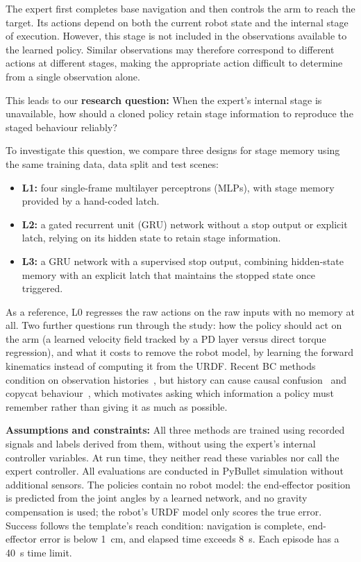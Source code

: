 \documentclass[conference]{IEEEtran}
\begin{document}
The expert first completes base navigation and then controls the arm
to reach the target. Its actions depend on both the current robot
state and the internal stage of execution. However, this stage is
not included in the observations available to the learned policy.
Similar observations may therefore correspond to different actions
at different stages, making the appropriate action difficult to
determine from a single observation alone.

This leads to our \textbf{research question:}
When the expert's internal stage is unavailable, how should a cloned
policy retain stage information to reproduce the staged behaviour
reliably?

To investigate this question, we compare three designs for stage
memory using the same training data, data split and test scenes:
\begin{itemize}
    \item \textbf{L1:} four single-frame multilayer perceptrons
    (MLPs), with stage memory provided by a hand-coded latch.

    \item \textbf{L2:} a gated recurrent unit (GRU) network without
    a stop output or explicit latch, relying on its hidden state
    to retain stage information.

    \item \textbf{L3:} a GRU network with a supervised stop output,
    combining hidden-state memory with an explicit latch that
    maintains the stopped state once triggered.
\end{itemize}
As a reference, L0 regresses the raw actions on the raw inputs with no memory at all. Two further
questions run through the study: how the policy should act on the arm (a learned velocity field tracked by
a PD layer versus direct torque regression), and what it costs to remove the robot model, by learning the
forward kinematics instead of computing it from the URDF.
Recent BC methods condition on observation histories~\cite{zhao2023act,chi2023diffusion}, but history can
cause causal confusion~\cite{dehaan2019causal} and copycat behaviour~\cite{wen2020copycat}, which motivates
asking which information a policy must remember rather than giving it as much as possible.

\textbf{Assumptions and constraints:}
All three methods are trained using recorded signals and labels
derived from them, without using the expert's internal controller
variables. At run time, they neither read these variables nor call
the expert controller. All evaluations are conducted in PyBullet
simulation without additional sensors. The policies contain no robot
model: the end-effector position is predicted from the joint angles by
a learned network, and no gravity compensation is used; the robot's
URDF model only scores the true error. Success follows the template's
reach condition: navigation is complete, end-effector error is below
1~cm, and elapsed time exceeds 8~s. Each episode has a 40~s time limit.
\end{document}
